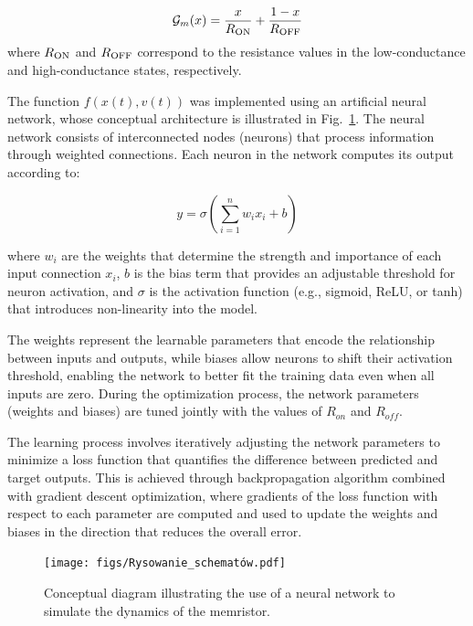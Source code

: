 \documentclass[11pt, oneside]{article}
\newcommand{\G}{\mathcal{G}}
\newcommand{\Ron}{R_{\rm ON}}
\newcommand{\Roff}{R_{\rm OFF}}
\newcommand{\ua}{v}
\newcommand{\xw}{x}
\begin{document}
\begin{equation}
    \G_{m}(\xw) = \frac{\xw}{R_{\rm ON}} + \frac{1 - \xw}{R_{\rm OFF}}
    \label{eq:conductance}
\end{equation}
where $\Ron$ and $\Roff$ correspond to the resistance values in the low-conductance and high-conductance states, respectively.

The function $f(\xw(t), \ua(t))$ was implemented using an artificial neural network, whose conceptual architecture is illustrated in Fig.~\ref{fig:nn_structure}. The neural network consists of interconnected nodes (neurons) that process information through weighted connections. Each neuron in the network computes its output according to:

\begin{equation}
    y = \sigma\left(\sum_{i=1}^{n} w_i x_i + b\right)
\end{equation}

where $w_i$ are the weights that determine the strength and importance of each input connection $x_i$, $b$ is the bias term that provides an adjustable threshold for neuron activation, and $\sigma$ is the activation function (e.g., sigmoid, ReLU, or tanh) that introduces non-linearity into the model.

The weights represent the learnable parameters that encode the relationship between inputs and outputs, while biases allow neurons to shift their activation threshold, enabling the network to better fit the training data even when all inputs are zero. During the optimization process, the network parameters (weights and biases) are tuned jointly with the values of $R_{on}$ and $R_{off}$.

The learning process involves iteratively adjusting the network parameters to minimize a loss function that quantifies the difference between predicted and target outputs. This is  achieved through backpropagation algorithm combined with gradient descent optimization, where gradients of the loss function with respect to each parameter are computed and used to update the weights and biases in the direction that reduces the overall error.

\begin{figure}[H]
    \centering
    \texttt{[image: figs/Rysowanie\_schematów.pdf]}
    \caption{Conceptual diagram illustrating the use of a neural network to simulate the dynamics of the memristor.}
    \label{fig:nn_structure}
\end{figure}
\end{document}
